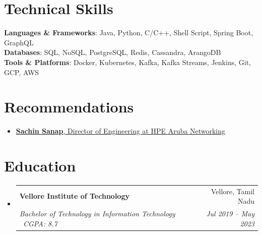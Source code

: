 \documentclass[letterpaper,11pt]{article}
\makeatletter
\newcommand{\resumeSubheading}[4]{
  \vspace{-2pt}\item
    \begin{tabular*}{0.97\textwidth}[t]{l@{\extracolsep{\fill}}r}
      \textbf{#1} & #2 \\
      \textit{\small#3} & \textit{\small #4} \\
    \end{tabular*}\vspace{-7pt}
}
\newcommand{\resumeSubHeadingListStart}{\begin{itemize}[leftmargin=0.15in, label={}]}
\newcommand{\resumeSubHeadingListEnd}{\end{itemize}}
\makeatother
\begin{document}
\section{Technical Skills}
 \begin{itemize}[leftmargin=0.15in, label={}]
    \small{\item{
    \textbf{Languages \& Frameworks}{: Java, Python, C/C++, Shell Script, Spring Boot, GraphQL} \\
    \textbf{Databases}{: SQL, NoSQL, PostgreSQL, Redis, Cassandra, ArangoDB} \\
    \textbf{Tools \& Platforms}{: Docker, Kubernetes, Kafka, Kafka Streams, Jenkins, Git, GCP, AWS}
    }}
 \end{itemize}

\section{Recommendations}
\begin{itemize}[leftmargin=0.15in, label={}]
    \item \small{
        \href{https://www.linkedin.com/in/aadimanchekar/details/recommendations}{\textbf{Sachin Sanap}, Director of Engineering at HPE Aruba Networking}
    }
\end{itemize}

\section{Education}
  \resumeSubHeadingListStart
    \resumeSubheading
      {Vellore Institute of Technology}{Vellore, Tamil Nadu}
      {Bachelor of Technology in Information Technology \textbar\ CGPA: 8.7}{Jul 2019 -- May 2023}
  \resumeSubHeadingListEnd

\end{document}

